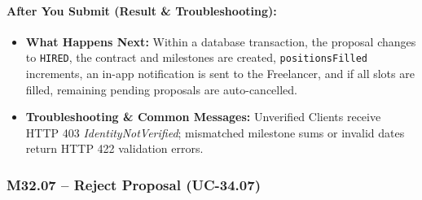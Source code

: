 \paragraph{After You Submit (Result \& Troubleshooting):}
\begin{itemize}[leftmargin=1.5em,itemsep=2pt]
  \item \textbf{What Happens Next:} Within a database transaction, the proposal changes to \texttt{HIRED}, the contract and milestones are created, \texttt{positionsFilled} increments, an in-app notification is sent to the Freelancer, and if all slots are filled, remaining pending proposals are auto-cancelled.
  \item \textbf{Troubleshooting \& Common Messages:} Unverified Clients receive HTTP 403 \textit{IdentityNotVerified}; mismatched milestone sums or invalid dates return HTTP 422 validation errors.
\end{itemize}

\newpage
\subsubsection{M32.07 -- Reject Proposal (UC-34.07)}

